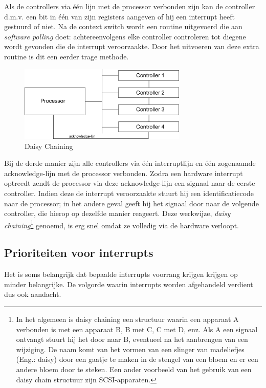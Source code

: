 Als de controllers via \'e\'en lijn met de processor verbonden zijn
kan de controller d.m.v. een bit in \'e\'en van zijn registers aangeven of
hij een interrupt heeft gestuurd of niet. Na de context switch wordt
een routine uitgevoerd die aan \emph{software polling}
doet: achtereenvolgens elke controller controleren tot diegene wordt
gevonden die de interrupt veroorzaakte. Door het uitvoeren van deze
extra routine is dit een eerder trage methode.

\begin{figure}
\begin{center}
\includegraphics[width=80mm]{images/fig0205.png}
\end{center}
\caption{Daisy Chaining}
\label{daisy}
\end{figure}

Bij de derde manier zijn alle controllers via \'e\'en interruptlijn
en \'e\'en zogenaamde acknowledge-lijn met de processor verbonden. Zodra
een hardware interrupt optreedt zendt de processor via deze
acknowledge-lijn een signaal naar de eerste controller. Indien deze de
interrupt veroorzaakte stuurt hij een identificatiecode naar de
processor; in het andere geval geeft hij het signaal door naar de
volgende controller, die hierop op dezelfde manier reageert. Deze
werkwijze, \emph{daisy chaining}\footnote{In het algemeen is daisy chaining een
structuur waarin een apparaat A verbonden is met een apparaat B, B met C, C met
D, enz. Als A een signaal ontvangt stuurt hij het door naar B, eventueel na het
aanbrengen van een wijziging. De naam komt van het vormen van een slinger van
madeliefjes (Eng.: daisy) door een gaatje te maken in de stengel van een bloem
en er een andere bloem door te steken. Een ander voorbeeld van het gebruik van
een daisy chain structuur zijn SCSI-apparaten.} genoemd, is erg snel omdat ze
volledig via de hardware verloopt.

\subsection{Prioriteiten voor interrupts}

Het is soms belangrijk dat bepaalde interrupts voorrang krijgen
krijgen op minder belangrijke. De volgorde waarin interrupts worden
afgehandeld verdient dus ook aandacht.

